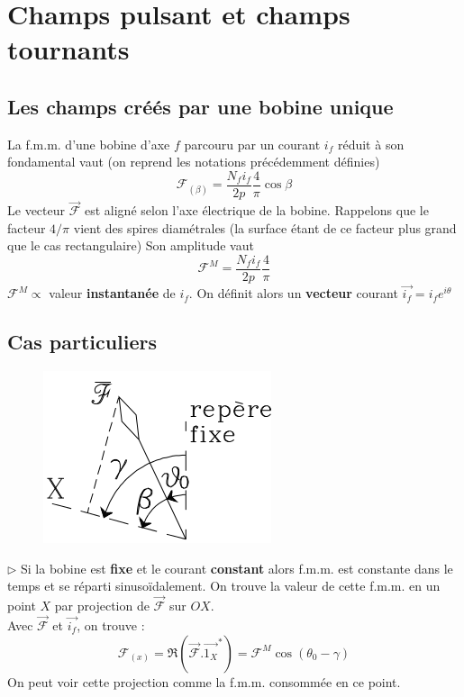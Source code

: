 	
	\newpage
\section{Champs pulsant et champs tournants}
	\subsection{Les champs créés par une bobine unique}
	La f.m.m. d'une bobine d'axe $f$ parcouru par un courant $i_f$ réduit à son 
	fondamental vaut (on reprend les notations précédemment définies)
	\begin{equation}
	\mathcal{F}_{(\beta)} = \dfrac{N_fi_f}{2p}\dfrac{4}{\pi}\cos\beta
	\end{equation}
	Le vecteur $\vec{\mathcal{F}}$ est aligné selon l'axe électrique de la bobine. 
	Rappelons que le facteur $4/\pi$ vient des spires diamétrales (la surface étant 
	de ce facteur plus grand que le cas rectangulaire)
	Son amplitude vaut 
	\begin{equation}
	\mathcal{F}^M = \dfrac{N_fi_f}{2p}\dfrac{4}{\pi}
	\end{equation}
	$\mathcal{F}^M \propto$ valeur \textbf{instantanée} de $i_f$. On définit alors 
	un \textbf{vecteur} courant $\vec{i_f} = i_fe^{i\theta}$



		\subsection{Cas particuliers}
			\begin{figure}
	\vspace{-8mm}
	\includegraphics[scale=0.5]{ch5/image16.png}
	\end{figure}
		$\triangleright$ Si la bobine est \textbf{fixe} et le courant \textbf{constant} 
		alors f.m.m. est constante dans le temps et se réparti sinusoïdalement. On trouve 
		la valeur de cette f.m.m. en un point $X$ par projection de $\vec{\mathcal{F}}$ 
		sur $OX$.\\
		Avec $\vec{\mathcal{F}}$ et $\vec{i_f}$, on trouve :
		\begin{equation}
		\mathcal{F}_{(x)} = \Re(\vec{\mathcal{F}}.\vec{1_X}^*) = \mathcal{F}^M\cos(
		\theta_0-\gamma)
		\end{equation}
		On peut voir cette projection comme la f.m.m. consommée en ce point.\\
		
